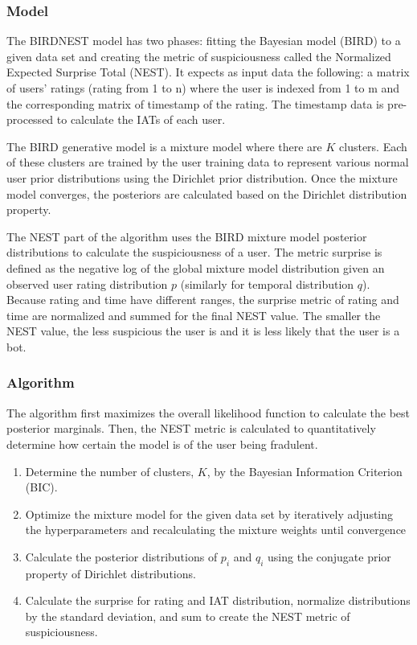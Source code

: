 \documentclass[11pt, oneside]{article}   	%
\begin{document}
\subsubsection*{Model}

\quad The BIRDNEST model has two phases: fitting the Bayesian model (BIRD) to a given data set and creating the metric of suspiciousness called the Normalized Expected Surprise Total (NEST).
It expects as input data the following: a matrix of users' ratings (rating from 1 to n) where the user is indexed from 1 to m and the corresponding matrix of timestamp of the rating.
The timestamp data is pre-processed to calculate the IATs of each user.

\quad The BIRD generative model is a mixture model where there are $K$ clusters.
Each of these clusters are trained by the user training data to represent various normal user prior distributions using the Dirichlet prior distribution.
Once the mixture model converges, the posteriors are calculated based on the Dirichlet distribution property.

\quad The NEST part of the algorithm uses the BIRD mixture model posterior distributions to calculate the suspiciousness of a user.
The metric surprise is defined as the negative log of the global mixture model distribution given an observed user rating distribution $p$ (similarly for temporal distribution $q$).
Because rating and time have different ranges, the surprise metric of rating and time are normalized and summed for the final NEST value.
The smaller the NEST value, the less suspicious the user is and it is less likely that the user is a bot.

\subsubsection*{Algorithm}

\quad The algorithm first maximizes the overall likelihood function to calculate the best posterior marginals.
Then, the NEST metric is calculated to quantitatively determine how certain the model is of the user being fradulent.
\begin{enumerate}
	\item Determine the number of clusters, $K$, by the Bayesian Information Criterion (BIC).
	\item Optimize the mixture model for the given data set by iteratively adjusting the hyperparameters and recalculating the mixture weights until convergence
	\item Calculate the posterior distributions of $p_i$ and $q_i$ using the conjugate prior property of Dirichlet distributions.
	\item Calculate the surprise for rating and IAT distribution, normalize distributions by the standard deviation, and sum to create the NEST metric of suspiciousness. 
\end{enumerate}
\end{document}
